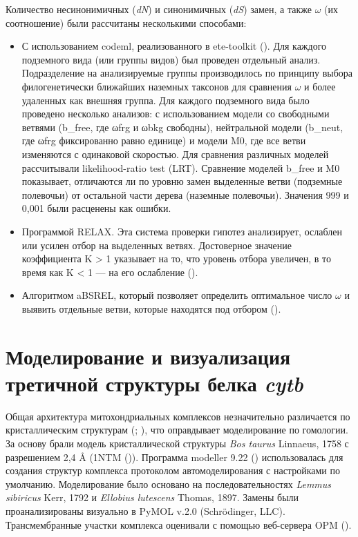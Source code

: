 Количество несинонимичных (\textit{dN}) и синонимичных (\textit{dS}) замен, а также $\omega$ (их соотношение) были рассчитаны несколькими способами: 
\begin{itemize}
	\item[\textbullet] С использованием codeml, реализованного в ete-toolkit (\cite{Huerta-Cepas2016}). Для каждого подземного вида (или группы видов) был проведен отдельный анализ. Подразделение на анализируемые группы производилось по принципу выбора филогенетически ближайших наземных таксонов для сравнения $\omega$ и более удаленных как внешняя группа. Для каждого подземного вида было проведено несколько анализов: с использованием модели со свободными ветвями (b\_free, где ωfrg и ωbkg свободны), нейтральной модели (b\_neut, где ωfrg фиксированно равно единице) и модели M0, где все ветви изменяются с одинаковой скоростью. Для сравнения различных моделей рассчитывали likelihood-ratio test (LRT). Сравнение моделей b\_free и M0 показывает, отличаются ли по уровню замен выделенные ветви (подземные полевочьи) от остальной части дерева (наземные полевочьи). Значения 999 и 0,001 были расценены как ошибки.
	\item[\textbullet] Программой RELAX. Эта система проверки гипотез анализирует, ослаблен или усилен отбор на выделенных ветвях. Достоверное значение коэффициента K > 1 указывает на то, что уровень отбора увеличен, в то время как K < 1 --- на его ослабление (\cite{Wertheim2015}).
	\item[\textbullet] Алгоритмом aBSREL, который позволяет определить оптимальное число $\omega$ и выявить отдельные ветви, которые находятся под отбором (\cite{Smith2015}).     
\end{itemize}


\section{Моделирование и визуализация третичной структуры белка \textit{cytb}}

Общая архитектура митохондриальных комплексов незначительно различается по кристаллическим структурам (\cite{Crowley2008}; \cite{Hunte2000}), что оправдывает моделирование по гомологии. За основу брали модель кристаллической структуры  \textit{Bos taurus} Linnaeus, 1758 с разрешением 2,4 Å (1NTM (\cite{Gao2003})). Программа modeller 9.22 (\cite{Webb2016}) использовалась для создания структур комплекса протоколом автомоделирования с настройками по умолчанию. Моделирование было основано на последовательностях \textit{Lemmus sibiricus} Kerr, 1792 и \textit{Ellobius lutescens} Thomas, 1897. Замены были проанализированы визуально в PyMOL v.2.0 (Schrödinger, LLC). Трансмембранные участки комплекса оценивали с помощью веб-сервера OPM (\cite{Lomize2012}). 

